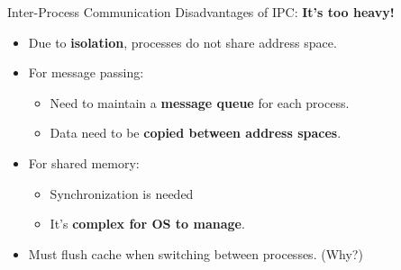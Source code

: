 \begin{frame}[fragile]{Inter-Process Communication}
	Disadvantages of IPC: \textbf{It's too heavy!} 
	\begin{itemize}
		\item Due to \textbf{isolation}, processes do not share address space.
		\item<2-> For message passing:
		      \begin{itemize}
			      \item Need to maintain a \textbf{message queue} for each process.
			      \item Data need to be \textbf{copied between address spaces}.
		      \end{itemize}
		\item<3-> For shared memory:
		      \begin{itemize}
			      \item Synchronization is needed
			      \item It's \textbf{complex for OS to manage}.
		      \end{itemize}
		\item<4-> Must flush cache when switching between processes. (Why?)
	\end{itemize}
\end{frame}
